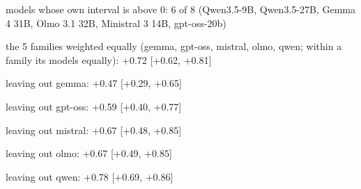   \item models whose own interval is above 0: 6 of 8 (Qwen3.5-9B, Qwen3.5-27B, Gemma 4 31B, Olmo 3.1 32B, Ministral 3 14B, gpt-oss-20b)
  \item the 5 families weighted equally (gemma, gpt-oss, mistral, olmo, qwen; within a family its models equally): +0.72 [+0.62, +0.81]
  \item leaving out gemma: +0.47 [+0.29, +0.65]
  \item leaving out gpt-oss: +0.59 [+0.40, +0.77]
  \item leaving out mistral: +0.67 [+0.48, +0.85]
  \item leaving out olmo: +0.67 [+0.49, +0.85]
  \item leaving out qwen: +0.78 [+0.69, +0.86]
